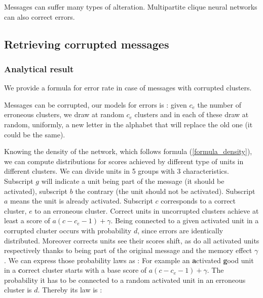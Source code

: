\documentclass[english,10pt,twocolumn]{IEEEtran}
\theoremstyle{definition}
\begin{document}
	Messages can suffer many types of alteration. Multipartite clique neural networks can also correct errors.	
	
	\subsection{Retrieving corrupted messages}
	
	\subsubsection{Analytical result}
%	
%	
%	
%	
%	
	
	We provide a formula for error rate in case of messages with corrupted clusters.

	Messages can be corrupted, our models for errors is : given $c_e$ the number of erroneous clusters, we draw at random $c_e$ clusters and in each of these draw at random, uniformly, a new letter in the alphabet that will replace the old one (it could be the same).
	
	Knowing the density of the network, which follows formula (\ref{formula_density}), we can compute distributions for scores achieved by different type of units in different clusters. We can divide units in 5 groups with 3 characteristics. Subscript $g$ will indicate a unit being part of the message (it should be activated), subscript $b$ the contrary (the unit should not be activated). Subscript $a$ means the unit is already activated. Subscript $c$ corresponds to a correct cluster, $e$ to an erroneous cluster.
	Correct units in uncorrupted clusters achieve at least a score of $a(c-c_e - 1) + \gamma$. 
	Being connected to a given activated unit in a corrupted cluster occurs with probability $d$, since errors are identically distributed. Moreover corrects units see their scores shift, as do all activated units respectively thanks to being part of the original message and the memory effect $\gamma$. We can express those probability laws as : 
	For example an \textbf{a}ctivated \textbf{g}ood unit in a \textbf{c}orrect cluster starts with a base score of $ a(c - c_e - 1) + \gamma$. The probability it has to be connected to a random activated unit in an erroneous cluster is $d$. Thereby its law is :
	
\end{document}
